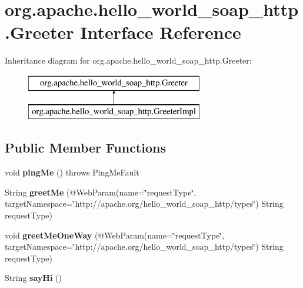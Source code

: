 \hypertarget{interfaceorg_1_1apache_1_1hello__world__soap__http_1_1_greeter}{}\section{org.\+apache.\+hello\+\_\+world\+\_\+soap\+\_\+http.\+Greeter Interface Reference}
\label{interfaceorg_1_1apache_1_1hello__world__soap__http_1_1_greeter}
Inheritance diagram for org.\+apache.\+hello\+\_\+world\+\_\+soap\+\_\+http.\+Greeter\+:\begin{figure}[H]
\begin{center}
\leavevmode
\includegraphics[height=2.000000cm]{interfaceorg_1_1apache_1_1hello__world__soap__http_1_1_greeter}
\end{center}
\end{figure}
\subsection*{Public Member Functions}
\begin{DoxyCompactItemize}
\item 
\hypertarget{interfaceorg_1_1apache_1_1hello__world__soap__http_1_1_greeter_a2a0ac0f6631a016fcff8dc54f0f6793d}{}void {\bfseries ping\+Me} ()  throws Ping\+Me\+Fault\label{interfaceorg_1_1apache_1_1hello__world__soap__http_1_1_greeter_a2a0ac0f6631a016fcff8dc54f0f6793d}

\item 
\hypertarget{interfaceorg_1_1apache_1_1hello__world__soap__http_1_1_greeter_a21b1c5749654a4e749290c9feea2e4e4}{}String {\bfseries greet\+Me} (@Web\+Param(name=\char`\"{}request\+Type\char`\"{}, target\+Namespace=\char`\"{}http\+://apache.\+org/hello\+\_\+world\+\_\+soap\+\_\+http/types\char`\"{}) String request\+Type)\label{interfaceorg_1_1apache_1_1hello__world__soap__http_1_1_greeter_a21b1c5749654a4e749290c9feea2e4e4}

\item 
\hypertarget{interfaceorg_1_1apache_1_1hello__world__soap__http_1_1_greeter_ac4f76167b357e180cd978f3428862f37}{}void {\bfseries greet\+Me\+One\+Way} (@Web\+Param(name=\char`\"{}request\+Type\char`\"{}, target\+Namespace=\char`\"{}http\+://apache.\+org/hello\+\_\+world\+\_\+soap\+\_\+http/types\char`\"{}) String request\+Type)\label{interfaceorg_1_1apache_1_1hello__world__soap__http_1_1_greeter_ac4f76167b357e180cd978f3428862f37}

\item 
\hypertarget{interfaceorg_1_1apache_1_1hello__world__soap__http_1_1_greeter_a228b4049cedd50562eecf20c8307b71c}{}String {\bfseries say\+Hi} ()\label{interfaceorg_1_1apache_1_1hello__world__soap__http_1_1_greeter_a228b4049cedd50562eecf20c8307b71c}

\end{DoxyCompactItemize}


